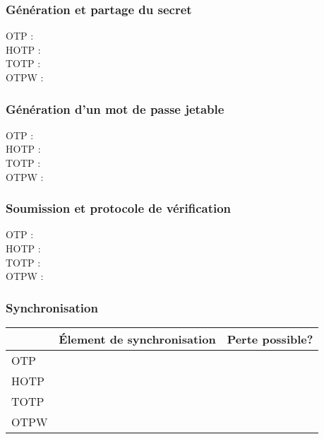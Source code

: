 \subsubsection{Génération et partage du secret}

	\begin{description}
		\item[OTP :]
		\item[HOTP :]
		\item[TOTP :]
		\item[OTPW :]
	\end{description}

\subsubsection{Génération d'un mot de passe jetable}

	\begin{description}
		\item[OTP :]
		\item[HOTP :]
		\item[TOTP :]
		\item[OTPW :]
	\end{description}

\subsubsection{Soumission et protocole de vérification}

	\begin{description}
		\item[OTP :]
		\item[HOTP :]
		\item[TOTP :]
		\item[OTPW :]
	\end{description}

\subsubsection{Synchronisation}
	\begin{tabular}{p{3cm} | p{8cm} | p{4cm} |}
		\hline
		& \cellcolor{gray} Élement de synchronisation & Perte possible? \\
		\hline
		OTP &  &  \\
		\hline
		HOTP &  &  \\
		\hline
		TOTP &  &  \\
		\hline
		OTPW &  &  \\
		\hline
	\end{tabular}

